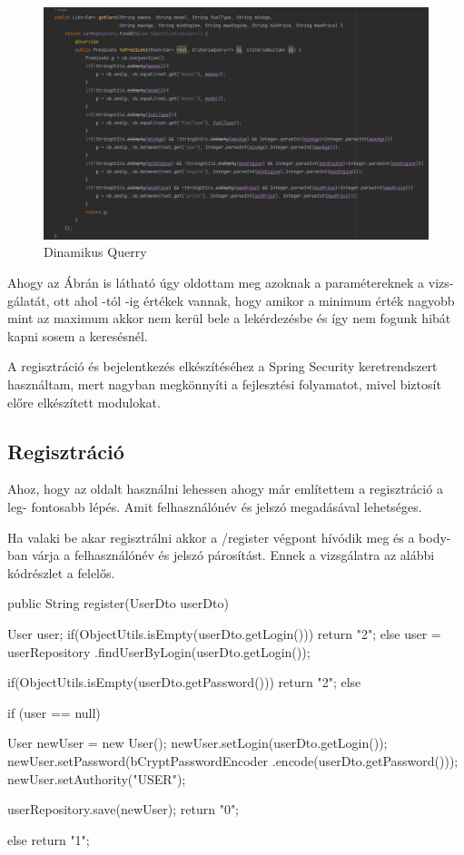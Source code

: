 \begin{figure}[h]
\centering
\includegraphics[scale=0.6]{images/Dinamikus_Querry.png}
\caption{Dinamikus Querry}
\label{fig:Dinamikus_Querry}
\end{figure}

Ahogy az Ábrán is látható úgy oldottam meg azoknak a paramétereknek a vizs-
gálatát, ott ahol -tól -ig értékek vannak, hogy amikor a minimum érték nagyobb mint az maximum akkor nem kerül bele a lekérdezésbe és így nem fogunk hibát kapni sosem a keresésnél.

A regisztráció és bejelentkezés elkészítéséhez a Spring Security keretrendszert\cite{SpringSecurity} használtam, mert nagyban megkönnyíti a fejlesztési folyamatot, mivel biztosít előre elkészített modulokat.

\subsection{Regisztráció}
Ahoz, hogy az oldalt használni lehessen ahogy már említettem a regisztráció a leg-
fontosabb lépés. Amit felhasználónév és  jelszó megadásával lehetséges. 

Ha valaki be akar regisztrálni akkor a /register végpont hívódik meg és a body-ban várja a felhasználónév és jelszó párosítást. Ennek a vizsgálatra az alábbi kódrészlet a felelős.

\begin{java}
 public String register(UserDto userDto) {
        User user;
        if(ObjectUtils.isEmpty(userDto.getLogin())){
            return "2";
        }else{
           user = userRepository
           .findUserByLogin(userDto.getLogin());
        }

        if(ObjectUtils.isEmpty(userDto.getPassword())) {
            return "2";
        }
        else {
            if (user == null) {
                User newUser = new User();
                newUser.setLogin(userDto.getLogin());
                newUser.setPassword(bCryptPasswordEncoder
                        .encode(userDto.getPassword()));
                newUser.setAuthority("USER");

                userRepository.save(newUser);
                return "0";
            } else {
                return "1";
            }
        }
    }
\end{java}

